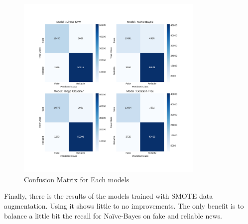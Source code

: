 \begin{figure}
 \centering
 \includegraphics[width=0.8\textwidth]{images/chapitre3/test_fake_confMat}
 \caption{Confusion Matrix for Each models}
 \label{fig:chap3:confMat2}
\end{figure}
Finally, there is the results of the models trained with SMOTE data augmentation. Using it shows little to no improvements. The only benefit is to balance a little bit the recall for Na\"{i}ve-Bayes on fake and reliable news. 
